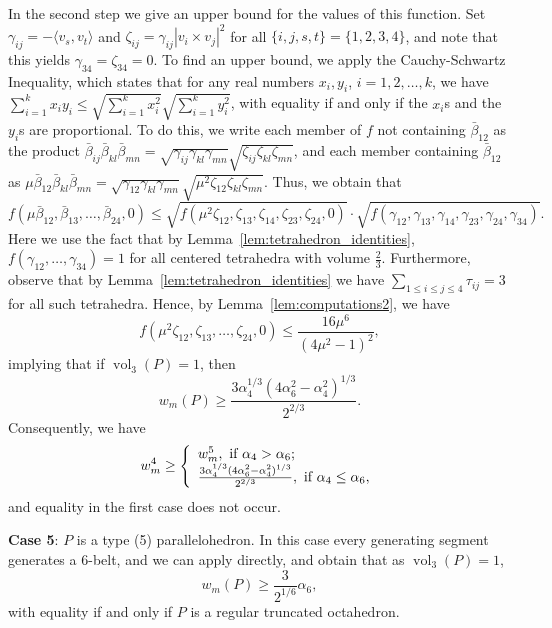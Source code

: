 \documentclass[twoside]{amsart}
\theoremstyle{definition}
\DeclareMathOperator{\vol}{vol}
\begin{document}
In the second step we give an upper bound for the values of this function.
Set $\gamma_{ij} = - \langle v_s, v_t \rangle$ and $\zeta_{ij}= \gamma_{ij} |v_i \times v_j|^2$ for all $\{i,j,s,t\} = \{ 1,2,3,4\}$, and note that this yields $\gamma_{34}=\zeta_{34}=0$.
To find an upper bound, we apply the Cauchy-Schwartz Inequality, which states that for any real numbers $x_i,y_i$, $i=1,2,\ldots, k$, we have
$\sum_{i=1}^k x_i y_i \leq \sqrt{\sum_{i=1}^k x_i^2} \sqrt{\sum_{i=1}^k y_i^2}$, with equality if and only if the $x_i$s and the $y_i$s are proportional.
To do this, we write each member of $f$ not containing $\bar{\beta}_{12}$ as the product $\bar{\beta}_{ij} \bar{\beta}_{kl} \bar{\beta}_{mn} = \sqrt{\gamma_{ij} \gamma_{kl} \gamma_{mn}} \sqrt{\zeta_{ij} \zeta_{kl} \zeta_{mn}}$, and each member containing $\bar{\beta}_{12}$ as $ \mu \bar{\beta}_{12} \bar{\beta}_{kl} \bar{\beta}_{mn} = \sqrt{\gamma_{12} \gamma_{kl} \gamma_{mn}} \sqrt{\mu^2 \zeta_{12} \zeta_{kl} \zeta_{mn}}$. Thus, we obtain that
\[
f(\mu \bar{\beta}_{12},\bar{\beta}_{13},\ldots,\bar{\beta}_{24},0) \leq \sqrt{f(\mu^2 \zeta_{12},\zeta_{13},\zeta_{14},\zeta_{23},\zeta_{24},0)} \cdot
\sqrt{f(\gamma_{12},\gamma_{13},\gamma_{14},\gamma_{23},\gamma_{24},\gamma_{34})}.
\]
Here we use the fact that by Lemma~\ref{lem:tetrahedron_identities}, $f(\gamma_{12}, \ldots, \gamma_{34}) = 1$ for all centered tetrahedra with volume $\frac{2}{3}$.
Furthermore, observe that by Lemma~\ref{lem:tetrahedron_identities} we have $\sum_{1 \leq i \leq j \leq 4} \tau_{ij} = 3$ for all such tetrahedra. Hence, 
by Lemma~\ref{lem:computations2}, we have
\[
f(\mu^2 \zeta_{12}, \zeta_{13}, \ldots, \zeta_{24},0) \leq \frac{16 \mu^6}{(4\mu^2 - 1)^2},
\]
implying that if $\vol_3(P) = 1$, then
\[
w_m(P) \geq \frac{3 \alpha_4^{1/3} (4 \alpha_6^2 - \alpha_4^2)^{1/3}}{2^{2/3}}.
\]
Consequently, we have
\begin{equation}\label{eq:type4result}
w_m^4 \geq \left\{
\begin{array}{l}
w_m^5, \hbox{ if } \alpha_4 > \alpha_6;\\
\frac{3 \alpha_4^{1/3} (4 \alpha_6^2 - \alpha_4^2)^{1/3}}{2^{2/3}}, \hbox{ if } \alpha_4 \leq \alpha_6,
\end{array}
\right.
\end{equation}
and equality in the first case does not occur.

\textbf{Case 5}: $P$ is a type (5) parallelohedron.
In this case every generating segment generates a $6$-belt, and we can apply \cite[Theorem 1]{Langi} directly, and obtain that
as $\vol_3(P)=1$,
\[
w_m(P) \geq \frac{3}{2^{1/6}} \alpha_6,
\]
with equality if and only if $P$ is a regular truncated octahedron.
\end{document}
